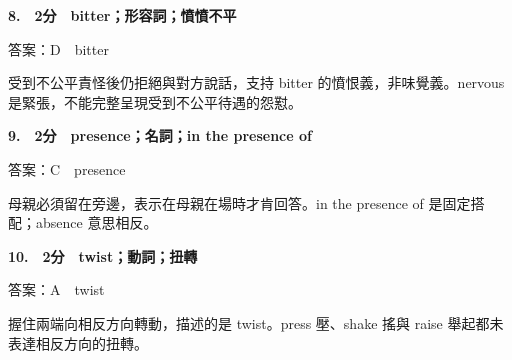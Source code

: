 \documentclass[11pt,a4paper]{article}
\begin{document}
\medskip
{}\textbf{8.　2分　bitter；形容詞；憤憤不平}\par
答案：D　bitter
\par\smallskip
受到不公平責怪後仍拒絕與對方說話，支持 bitter 的憤恨義，非味覺義。nervous 是緊張，不能完整呈現受到不公平待遇的怨懟。
\par\smallskip
\medskip
{}\textbf{9.　2分　presence；名詞；in the presence of}\par
答案：C　presence
\par\smallskip
母親必須留在旁邊，表示在母親在場時才肯回答。in the presence of 是固定搭配；absence 意思相反。
\par\smallskip
\medskip
{}\textbf{10.　2分　twist；動詞；扭轉}\par
答案：A　twist
\par\smallskip
握住兩端向相反方向轉動，描述的是 twist。press 壓、shake 搖與 raise 舉起都未表達相反方向的扭轉。
\par\smallskip
\medskip

\newpage
\end{document}
